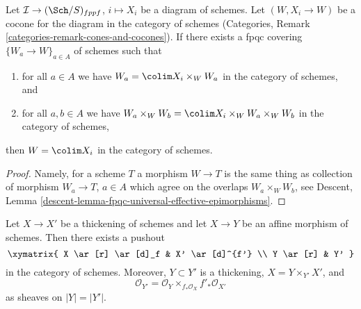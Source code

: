 \begin{lemma}
\label{lemma-pushout-fpqc-local}
Let $\mathcal{I} \to (\Sch/S)_{fppf}$, $i \mapsto X_i$ be a diagram of schemes.
Let $(W, X_i \to W)$ be a cocone for the diagram in the category of schemes
(Categories, Remark \ref{categories-remark-cones-and-cocones}).
If there exists a fpqc covering $\{W_a \to W\}_{a \in A}$ of schemes such that
\begin{enumerate}
\item for all $a \in A$ we have
$W_a = \colim X_i \times_W W_a$
in the category of schemes, and
\item for all $a, b \in A$ we have
$W_a \times_W W_b = \colim X_i \times_W W_a \times_W W_b$
in the category of schemes,
\end{enumerate}
then $W = \colim X_i$ in the category of schemes.
\end{lemma}

\begin{proof}
Namely, for a scheme $T$ a morphism $W \to T$ is the same thing as
collection of morphism $W_a \to T$, $a \in A$ which agree on the
overlaps $W_a \times_W W_b$, see
Descent, Lemma \ref{descent-lemma-fpqc-universal-effective-epimorphisms}.
\end{proof}

\begin{lemma}
\label{lemma-pushout-along-thickening}
Let $X \to X'$ be a thickening of schemes and let $X \to Y$ be an affine
morphism of schemes. Then there exists a pushout
$$
\xymatrix{
X \ar[r] \ar[d]_f
&
X' \ar[d]^{f'}
\\
Y \ar[r]
&
Y'
}
$$
in the category of schemes. Moreover, $Y \subset Y'$ is a
thickening, $X = Y \times_{Y'} X'$, and
$$
\mathcal{O}_{Y'} = \mathcal{O}_Y \times_{f_*\mathcal{O}_X} f'_*\mathcal{O}_{X'}
$$
as sheaves on $|Y| = |Y'|$.
\end{lemma}


